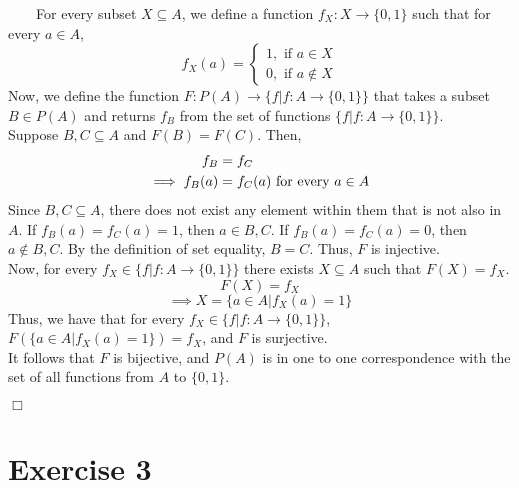 \documentclass[
]{article}
\begin{document}
~~~~For every subset \(X \subseteq A\), we define a function
\(f_X : X \to \{0,1\}\) such that for every \(a \in A\),
\[f_X(a) = \begin{cases} 1, \text{    if } a\in X \\ 0, \text{    if } a \notin X \end{cases}\]
Now, we define the function \(F: P(A) \to \{f|f:A \to \{ 0,1\}\}\) that
takes a subset \(B \in P(A)\) and returns \(f_B\) from the set of
functions \(\{f|f:A \to \{ 0,1\}\}\).\\
\hspace*{0.333em}\hspace*{0.333em}\hspace*{0.333em}\hspace*{0.333em}Suppose
\(B, C \subseteq A\) and \(F(B) = F(C)\). Then,
\[ \begin{aligned} f_B &= f_C \\
\implies f_B(a) &= f_C(a) \space \space \space \text{    for every } a \in A\end{aligned}\]
Since \(B, C \subseteq A\), there does not exist any element within them
that is not also in \(A\). If \(f_B(a) = f_C(a) = 1\), then
\(a \in B, C\). If \(f_B(a) = f_C(a) = 0\), then \(a \notin B, C\). By
the definition of set equality, \(B = C\). Thus, \(F\) is injective.\\
\hspace*{0.333em}\hspace*{0.333em}\hspace*{0.333em}\hspace*{0.333em}Now,
for every \(f_X \in \{f| f:A \to \{ 0,1\}\}\) there exists
\(X \subseteq A\) such that \(F(X) = f_X\). \[F(X) = f_X\]
\[\implies X = \{a \in A| f_X(a) = 1\}\] Thus, we have that for every
\(f_X \in \{f| f:A \to \{ 0,1\}\}\), \(F(\{a\in A|f_X(a)=1\}) = f_X\),
and \(F\) is surjective.\\
\hspace*{0.333em}\hspace*{0.333em}\hspace*{0.333em}\hspace*{0.333em}It
follows that \(F\) is bijective, and \(P(A)\) is in one to one
correspondence with the set of all functions from \(A\) to \(\{0, 1\}\).

\hfill \(\Box\)

\hypertarget{exercise-3}{%
\section{Exercise 3}\label{exercise-3}}
\end{document}
